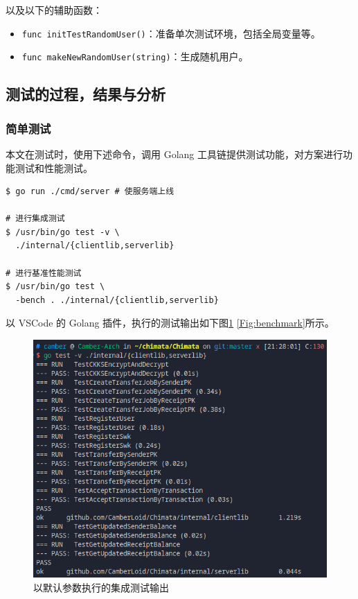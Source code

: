 以及以下的辅助函数：

\begin{itemize}
    \item \verb|func initTestRandomUser()|：准备单次测试环境，包括全局变量等。
    \item \verb|func makeNewRandomUser(string)|：生成随机用户。
\end{itemize}

\subsection{测试的过程，结果与分析}

\subsubsection{简单测试}

本文在测试时，使用下述命令，调用 Golang 工具链提供测试功能，对方案进行功能测试和性能测试。

\begin{verbatim}
$ go run ./cmd/server # 使服务端上线

# 进行集成测试
$ /usr/bin/go test -v \
  ./internal/{clientlib,serverlib}

# 进行基准性能测试
$ /usr/bin/go test \
  -bench . ./internal/{clientlib,serverlib}
\end{verbatim}

以 VSCode 的 Golang 插件，执行的测试输出如下图\ref{Fig:test} \ref{Fig:benchmark}所示。 

\begin{figure}[ht]
    \centering
    \includegraphics[width=0.9\linewidth]{./Figures/Test.png}
    \caption{以默认参数执行的集成测试输出}\label{Fig:test}
\end{figure}

